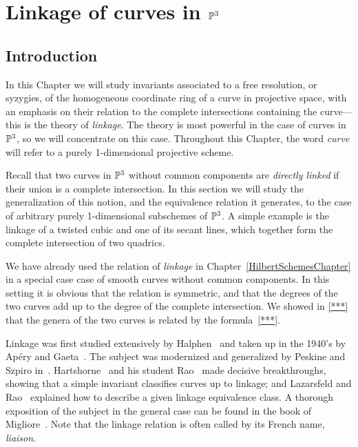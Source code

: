 

\chapter{Linkage of curves in ${\mathbb P}^3$}
\label{DualityChapter}\label{LinkageChapter}

\def\length{{\rm length}}
\def\red{{\rm red}}
\section{Introduction} 
In this Chapter we will study  invariants associated to a free resolution, or syzygies, of the homogeneous coordinate ring of a curve in projective space, with an emphasis on their relation to the complete intersections containing the curve---this is the theory of \emph{linkage}. The theory is most powerful in the case of curves in ${\mathbb P}^3$, so we will concentrate on this case. Throughout this Chapter, the word \emph{curve} will refer to a purely 1-dimensional projective scheme.

Recall that two curves in ${\mathbb P}^3$ without common components are \emph{directly linked} if their union is a complete intersection. In this section we will study the generalization of this notion, and the equivalence relation it generates, to the case of arbitrary purely 1-dimensional subschemes of ${\mathbb P}^3$. A simple example is the linkage of a twisted cubic and one of its secant lines, which together form the complete intersection of two quadrics.

We have already used the relation of \emph{ linkage} in Chapter~\ref{HilbertSchemesChapter}  in a special case case of smooth curves without common components. In this setting it is obvious that the relation is symmetric, and that the degrees of the two curves add up to the degree of the complete intersection. We showed in \ref{***} that the genera of the two curves is related by the formula~\ref{***}. 

Linkage was first studied extensively by Halphen~\cite{***} and taken up in the 1940's by Ap\'ery\cite{MR13558} and Gaeta~\cite{MR0052828}. The subject was modernized and generalized by Peskine and Szpiro in~\cite{MR0364271}. Hartshorne~\cite{****} and his student
Rao~\cite{****} made decisive breakthroughs, showing that a simple invariant classifies curves up to linkage; and Lazarsfeld and Rao~\cite{****} explained how to describe a given linkage equivalence class. A thorough exposition of the subject in the general case can be found in the book of Migliore~\cite{Mig}. Note that the linkage relation is often called by its French name, \emph{liaison}.

